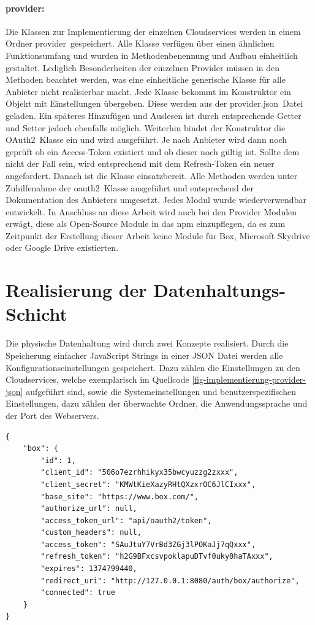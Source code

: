 \paragraph{provider:}Die Klassen zur Implementierung der einzelnen Cloudservices werden in einem Ordner \frqq provider\flqq\ gespeichert.
Alle Klasse verfügen über einen ähnlichen Funktionsumfang und wurden in Methodenbenennung und Aufbau einheitlich gestaltet.
Lediglich Besonderheiten der einzelnen Provider müssen in den Methoden beachtet werden, was eine einheitliche generische Klasse für alle Anbieter nicht realisierbar macht.
Jede Klasse bekommt im Konstruktor ein Objekt mit Einstellungen übergeben.
Diese werden aus der \frqq provider.json\flqq\ Datei geladen.
Ein späteres Hinzufügen und Auslesen ist durch entsprechende Getter und Setter jedoch ebenfalls möglich.
Weiterhin bindet der Konstruktor die \frqq OAuth2\flqq\ Klasse ein und wird ausgeführt.
Je nach Anbieter wird dann noch geprüft ob ein Access-Token existiert und ob dieser noch gültig ist.
Sollte dem nicht der Fall sein, wird entsprechend mit dem Refresh-Token ein neuer angefordert.
Danach ist die Klasse einsatzbereit.
Alle Methoden werden unter Zuhilfenahme der \frqq oauth2\flqq\ Klasse ausgeführt und entsprechend der Dokumentation des Anbieters umgesetzt.
Jedes Modul wurde wiederverwendbar entwickelt.
In Anschluss an diese Arbeit wird auch bei den Provider Modulen erwägt, diese als Open-Source Module in das npm einzupflegen, da es zum Zeitpunkt der Erstellung dieser Arbeit keine Module für Box, Microsoft Skydrive oder Google Drive existierten.
\newpage
\section{Realisierung der Datenhaltungs-Schicht}
Die physische Datenhaltung wird durch zwei Konzepte realisiert.
Durch die Speicherung einfacher JavaScript Strings in einer \ac{JSON} Datei werden alle Konfigurationseinstellungen gespeichert.
Dazu zählen die Einstellungen zu den Cloudservices, welche exemplarisch im Quellcode \ref{fig-implementierung-provider-json} aufgeführt sind, sowie die Systemeinstellungen und benutzerspezifischen Einstellungen, dazu zählen der überwachte Ordner, die Anwendungssprache und der Port des Webservers.

\begin{lstlisting}[label=fig-implementierung-provider-json,caption=JSON String eines Cloudservices]
{
    "box": {
        "id": 1,
        "client_id": "506o7ezrhhikyx35bwcyuzzg2zxxx",
        "client_secret": "KMWtKieXazyRHtQXzxrOC6JlCIxxx",
        "base_site": "https://www.box.com/",
        "authorize_url": null,
        "access_token_url": "api/oauth2/token",
        "custom_headers": null,
        "access_token": "SAuJtuY7VrBd3ZGj3lPOKaJj7qQxxx",
        "refresh_token": "h2G9BFxcsvpoklapuDTvf0uky0haTAxxx",
        "expires": 1374799440,
        "redirect_uri": "http://127.0.0.1:8080/auth/box/authorize",
        "connected": true
    }
}
\end{lstlisting}

